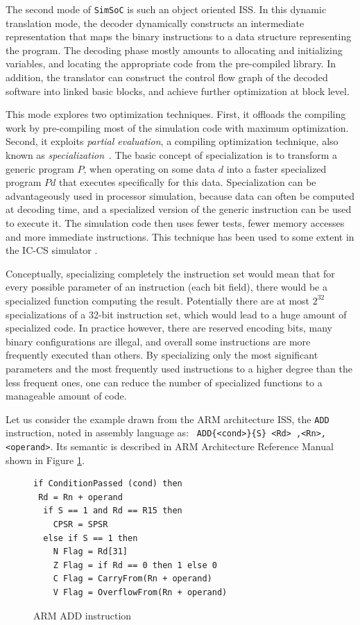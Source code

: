 \documentclass{llncs}
\newcommand{\simsoc}{\texttt{SimSoC}\xspace}
\begin{document}
The second mode of \simsoc is such an object oriented ISS. In this
dynamic translation mode, the decoder dynamically constructs an
intermediate representation that maps the binary instructions to a
data structure representing the program. The decoding phase mostly
amounts to allocating and initializing variables, and locating the
appropriate code from the pre-compiled library. In addition, the
translator can construct the control flow graph of the decoded
software into linked basic blocks, and achieve further optimization at
block level.

This mode explores two optimization techniques. First, it offloads the
compiling work by pre-compiling most of the simulation code with
maximum optimization. Second, it exploits \textit{partial evaluation},
a compiling optimization technique, also known as
\textit{specialization}~\cite{futamura}. The basic concept of
specialization is to transform a generic program $P$, when operating
on some data $d$ into a faster specialized program $Pd$ that executes
specifically for this data. Specialization can be advantageously used
in processor simulation, because data can often be computed at
decoding time, and a specialized version of the generic instruction
can be used to execute it. The simulation code then uses fewer tests,
fewer memory accesses and more immediate instructions. This technique
has been used to some extent in the IC-CS simulator
\cite{naul-braun-jit-iccs}.

Conceptually, specializing completely the instruction set would mean
that for every possible parameter of an instruction (each bit field),
there would be a specialized function computing the result.
Potentially there are at most $2^{32}$ specializations of a 32-bit
instruction set, which would lead to a huge amount of specialized
code.  In practice however, there are reserved encoding bits, many
binary configurations are illegal, and overall some instructions are
more frequently executed than others. By specializing only the most
significant parameters and the most frequently used instructions to a
higher degree than the less frequent ones, one can reduce the number
of specialized functions to a manageable amount of code.

Let us consider the example drawn from the ARM architecture ISS, the
{\tt ADD} instruction, noted in assembly language as: {\tt
  ADD\{<cond>\}\{S\} <Rd> ,<Rn>, <operand>}. Its semantic is described
in ARM Architecture Reference Manual~\cite{arm-ref-book} shown in
Figure \ref{fig:add-pseudocode}.
\begin{figure}[h]
  \centering
\begin{verbatim}
if ConditionPassed (cond) then
 Rd = Rn + operand
  if S == 1 and Rd == R15 then
    CPSR = SPSR
  else if S == 1 then
    N Flag = Rd[31]
    Z Flag = if Rd == 0 then 1 else 0
    C Flag = CarryFrom(Rn + operand)
    V Flag = OverflowFrom(Rn + operand)
\end{verbatim}
  \caption{ARM ADD instruction}
  \label{fig:add-pseudocode}
\end{figure}
\end{document}
